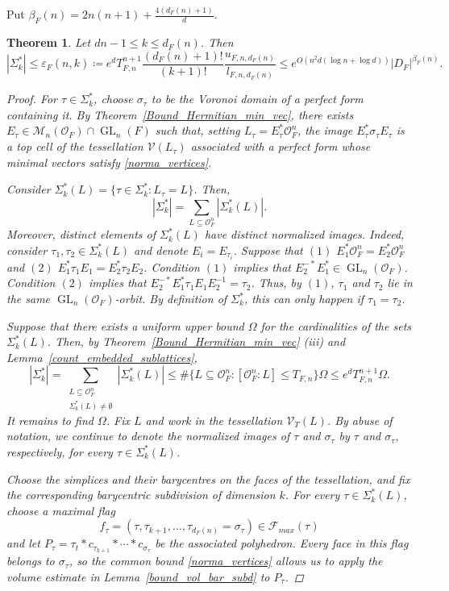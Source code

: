 \documentclass[11pt,a4paper,twoside]{amsart}
\theoremstyle{plain}
\newtheorem{theorem}{\bfseries Theorem}[section]
\theoremstyle{definition}
\newcommand{\rint}[0]{\mathcal{O}_F}
\newcommand{\disc}[0]{D_F}
\newcommand{\GLo}[0]{\operatorname{GL}_n({\mathcal{O}_F})}
\renewcommand{\leq}{\leqslant}
\begin{document}
Put $\beta_F(n)=2n(n+1)+\frac{4(d_F(n)+1)}{d}$.
\begin{theorem}
\label{bound_number_generators_vor_com}
Let $dn-1\leq k\leq d_F(n)$. Then
$$|\Sigma_k^*|\leq\varepsilon_F(n,k)\coloneqq e^dT_{F,n}^{n+1}\frac{(d_F(n)+1)!}{(k+1)!}\frac{u_{F,n,d_F(n)}}{l_{F,n,d_F(n)}}\leq e^{O(n^2d(\log n+\log d))}|\disc|^{\beta_F(n)}.$$

\begin{proof}
For $\tau\in\Sigma_k^*$, choose $\sigma_\tau$ to be the Voronoi domain of a perfect form containing it. By Theorem~\ref{Bound_Hermitian_min_vec}, there exists $E_\tau\in\mathcal{M}_n(\rint)\cap\operatorname{GL}_n(F)$ such that, setting $L_\tau=E_\tau^*\rint^n$, the image $E_\tau^*\sigma_\tau E_\tau$ is a top cell of the tessellation $\mathcal{V}(L_\tau)$ associated with a perfect form whose minimal vectors satisfy \eqref{norma_vertices}.

Consider $\Sigma_k^*(L)=\{\tau\in\Sigma_k^*:L_\tau=L\}$. Then,
\begin{equation*}
\label{sublatt_sum}
   |\Sigma_k^*|=\sum_{L\subseteq\rint^n}|\Sigma_k^*(L)|.
\end{equation*}
Moreover, distinct elements of $\Sigma_k^*(L)$ have distinct normalized images. Indeed, consider $\tau_1,\tau_2\in\Sigma_k^*(L)$ and denote $E_i=E_{\tau_i}$. Suppose that $(1)$ $E_1^*\rint^n=E_2^*\rint^n$ and $(2)$ $E_1^*\tau_1E_1=E_2^*\tau_2E_2$. Condition $(1)$ implies that $E_2^{-*}E_1^*\in\GLo$. Condition $(2)$ implies that $E_2^{-*}E_1^*\tau_1E_1E_2^{-1}=\tau_2$. Thus, by $(1)$, $\tau_1$ and $\tau_2$ lie in the same $\GLo$-orbit. By definition of $\Sigma_k^*$, this can only happen if $\tau_1=\tau_2$.

Suppose that there exists a uniform upper bound $\Omega$ for the cardinalities of the sets $\Sigma_k^*(L)$. Then, by Theorem~\ref{Bound_Hermitian_min_vec} (iii) and Lemma~\ref{count_embedded_sublattices},
\begin{equation}
    \label{1}
    |\Sigma_k^*|=\sum_{\substack{L\subseteq\rint^n\\ \Sigma_k^*(L)\neq \emptyset} }|\Sigma_k^*(L)| \leq\#\{L\subseteq\rint^n:[\rint^n:L]\leq T_{F,n}\}\Omega\leq e^dT_{F,n}^{n+1}\Omega.
\end{equation}
It remains to find $\Omega$. Fix $L$ and work in the tessellation $\mathcal{V}_T(L)$. By abuse of notation, we continue to denote the normalized images of $\tau$ and $\sigma_\tau$ by $\tau$ and $\sigma_\tau$, respectively, for every $\tau\in\Sigma_k^*(L)$.

Choose the simplices and their barycentres on the faces of the tessellation, and fix the corresponding barycentric subdivision of dimension $k$. For every $\tau\in\Sigma_k^*(L)$, choose a maximal flag $$f_\tau=(\tau,\tau_{k+1},\dots,\tau_{d_F(n)}=\sigma_\tau)\in\mathcal{F}_{max}(\tau)$$ and let $P_\tau=\tau_t*c_{\tau_{k+1}}*\cdots*c_{\sigma_\tau}$ be the associated polyhedron. Every face in this flag belongs to $\sigma_\tau$, so the common bound \eqref{norma_vertices} allows us to apply the volume estimate in Lemma~\ref{bound_vol_bar_subd} to $P_\tau$.


\end{proof}
\end{theorem}
\end{document}
